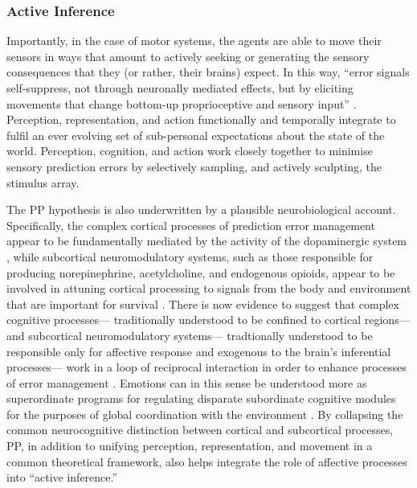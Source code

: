 \begin{CJK}{UTF8}{gbsn}
\subsubsection{Active Inference}
Importantly, in the case of motor systems, the agents are able to move their sensors in ways that amount to actively seeking or generating the sensory consequences that they (or rather, their brains) expect.  In this way, ``error signals self-suppress, not through neuronally mediated effects, but by eliciting movements that change bottom-up proprioceptive and sensory input'' \citep[186]{Clark2013}. Perception, representation, and action functionally and temporally integrate to fulfil an ever evolving set of sub-personal expectations about the state of the world.  Perception, cognition, and action work closely together to minimise sensory prediction errors by selectively sampling, and actively sculpting, the stimulus array.

The PP hypothesis is also underwritten by a plausible neurobiological account. Specifically, the complex cortical processes of prediction error management appear to be fundamentally mediated by the activity of the dopaminergic system \citep{Schultz2016}, while subcortical neuromodulatory systems, such as those responsible for producing norepinephrine, acetylcholine, and endogenous opioids, appear to be involved in attuning cortical processing to signals from the body and environment that are important for survival \citep{Lewis2005}.  There is now evidence to suggest that complex cognitive processes--- traditionally understood to be confined to cortical regions--- and subcortical neuromodulatory systems--- tradtionally understood to be responsible only for affective response and exogenous to the brain's inferential processes--- work in a loop of reciprocal interaction in order to enhance processes of error management \citep{Damasio1994,Lewis2005,Miller2017,Barrett2017}.
Emotions can in this sense be understood more as superordinate programs for regulating disparate subordinate cognitive modules for the purposes of global coordination with the environment \citep{Cosmides2000}.  By collapsing the common neurocognitive distinction between cortical and subcortical processes, PP, in addition to unifying perception, representation, and movement in a common theoretical framework, also helps integrate the role of affective processes into ``active inference.''


\end{CJK}
